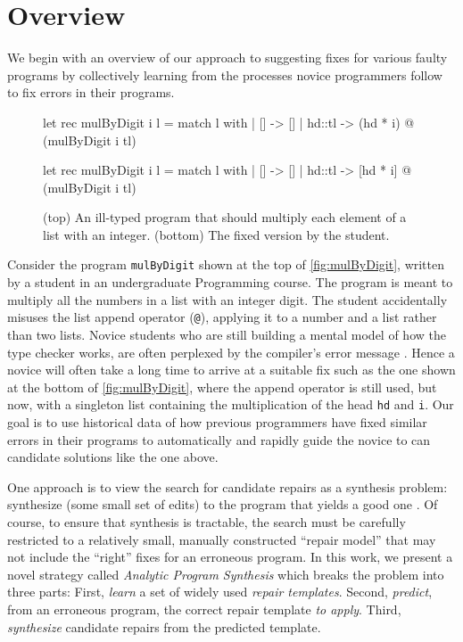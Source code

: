 \section{Overview}
\label{sec:overview}

We begin with an overview of our approach to suggesting fixes for various faulty
programs by collectively learning from the processes novice programmers follow
to fix errors in their programs.

\begin{figure}[ht]
\begin{ecode}
let rec mulByDigit i l =
  match l with
  | []     -> []
  | hd::tl -> (hd * i) @ (mulByDigit i tl)
\end{ecode}

\begin{ecode}
let rec mulByDigit i l =
  match l with
  | []     -> []
  | hd::tl -> [hd * i] @ (mulByDigit i tl)
\end{ecode}
\caption{(top) An ill-typed \ocaml program that should multiply each element
of a list with an integer. (bottom) The fixed version by the student.}
\label{fig:mulByDigit}
\end{figure}


 Consider the program \texttt{mulByDigit} shown at 
the top of \autoref{fig:mulByDigit}, written by a student in an undergraduate 
Programming course. The program is meant to multiply all the numbers in a list
with an integer digit. The student accidentally misuses the list append
operator (\texttt{@}), applying it to a number and a list rather than two lists.
%
Novice students who are still building a mental model of how the type checker
works, are often perplexed by the compiler's error message \cite{fixme}. 
Hence a novice will often take a long time to arrive at a suitable fix 
such as the one shown at the bottom of \autoref{fig:mulByDigit}, where 
the append operator is still used, but now, with a singleton list 
containing the multiplication of the head \texttt{hd} and \texttt{i}.
%
Our goal is to use historical data of how previous programmers have fixed
similar errors in their programs to automatically and rapidly guide the novice
to can candidate solutions like the one above.

%
One approach is to view the search for candidate repairs as a 
synthesis problem: synthesize (some small set of edits) to the 
program that yields a good one \cite{rishabh2013,fixme}.
%
Of course, to ensure that synthesis is tractable, the search must be 
carefully restricted to a relatively small, manually constructed 
``repair model'' that may not include the ``right'' fixes for an
erroneous program.
%
In this work, we present a novel strategy called 
\emph{Analytic Program Synthesis} which breaks the 
problem into three parts: 
%
First, \emph{learn} a set of widely used \emph{repair templates}.
%
Second, \emph{predict}, from an erroneous program, the correct repair template \emph{to apply}.
%
Third, \emph{synthesize} candidate repairs from the predicted template.

